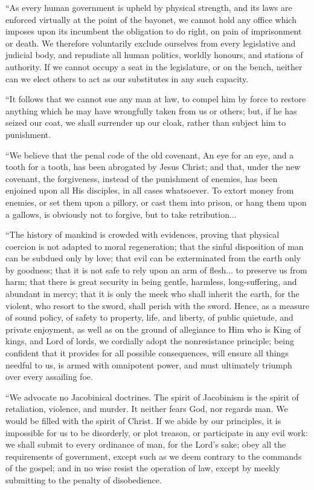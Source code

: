 \documentclass{book}
\begin{document}
“As every human government is upheld by physical strength, and its laws are enforced virtually at the point of the bayonet, we cannot hold any office which imposes upon its incumbent the obligation to do right, on pain of imprisonment or death. We therefore voluntarily exclude ourselves from every legislative and judicial body, and repudiate all human politics, worldly honours, and stations of authority. If we cannot occupy a seat in the legislature, or on the bench, neither can we elect others to act as our substitutes in any such capacity.

“It follows that we cannot sue any man at law, to compel him by force to restore anything which he may have wrongfully taken from us or others; but, if he has seized our coat, we shall surrender up our cloak, rather than subject him to punishment.

“We believe that the penal code of the old covenant, An eye for an eye, and a tooth for a tooth, has been abrogated by Jesus Christ; and that, under the new covenant, the forgiveness, instead of the punishment of enemies, has been enjoined upon all His disciples, in all cases whatsoever. To extort money from enemies, or set them upon a pillory, or cast them into prison, or hang them upon a gallows, is obviously not to forgive, but to take retribution...

“The history of mankind is crowded with evidences, proving that physical coercion is not adapted to moral regeneration; that the sinful disposition of man can be subdued only by love; that evil can be exterminated from the earth only by goodness; that it is not safe to rely upon an arm of flesh... to preserve us from harm; that there is great security in being gentle, harmless, long-suffering, and abundant in mercy; that it is only the meek who shall inherit the earth, for the violent, who resort to the sword, shall perish with the sword. Hence, as a measure of sound policy, of safety to property, life, and liberty, of public quietude, and private enjoyment, as well as on the ground of allegiance to Him who is King of kings, and Lord of lords, we cordially adopt the nonresistance principle; being confident that it provides for all possible consequences, will ensure all things needful to us, is armed with omnipotent power, and must ultimately triumph over every assailing foe.

“We advocate no Jacobinical doctrines. The spirit of Jacobinism is the spirit of retaliation, violence, and murder. It neither fears God, nor regards man. We would be filled with the spirit of Christ. If we abide by our principles, it is impossible for us to be disorderly, or plot treason, or participate in any evil work: we shall submit to every ordinance of man, for the Lord’s sake; obey all the requirements of government, except such as we deem contrary to the commands of the gospel; and in no wise resist the operation of law, except by meekly submitting to the penalty of disobedience.
\end{document}

